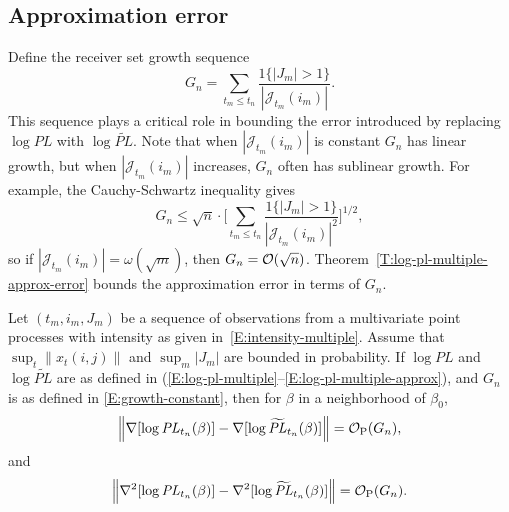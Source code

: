 \documentclass[final]{statsoc}
\begin{document}
\subsection{Approximation error}\label{S:approximation-error}
Define the receiver set growth sequence
\begin{equation}\label{E:growth-constant}
    G_n
        =
            \sum_{t_m \leq t_n}
                \frac{1\{|J_m| > 1\}}{|\mathcal{J}_{t_m}(i_m)|}.
\end{equation}
This sequence plays a critical role in bounding the error introduced by
replacing $\log \mathit{PL}$ with $\log \widetilde{\mathit{PL}}$.
Note that when $|\mathcal{J}_{t_m}(i_m)|$ is constant $G_n$ has linear
growth, but when $|\mathcal{J}_{t_m}(i_m)|$ increases, $G_n$ often has
sublinear growth.  For example, the Cauchy-Schwartz inequality gives
\[
    G_n
        \leq
            \sqrt{n}
            \cdot
            \bigg[
                \sum_{t_m \leq t_n}
                    \frac{1\{|J_m| > 1\}}{|\mathcal{J}_{t_m}(i_m)|^2}
            \bigg]^{1/2},
\]
so if $|\mathcal{J}_{t_m}(i_m)| = \omega(\sqrt{m})$, then
$G_n = \mathcal{O}(\sqrt{n})$.  Theorem~\ref{T:log-pl-multiple-approx-error} bounds
the approximation error in terms of $G_n$.

\begin{theorem}\label{T:log-pl-multiple-approx-error}
    Let $(t_m, i_m, J_m)$ be a sequence of observations from a multivariate
    point processes with intensity as given in~\eqref{E:intensity-multiple}.
    Assume that
    \(
        \sup_t \| x_t (i,j) \|
    \)
    and
    \(
        \sup_m | J_m |
    \)
    are bounded in probability.
    If $\log \mathit{PL}$ and $\log \widetilde{\mathit{PL}}$ are as
    defined in
    \textnormal{(}\ref{E:log-pl-multiple}--\ref{E:log-pl-multiple-approx}\textnormal{)},
    and $G_n$ is as defined in \eqref{E:growth-constant},
    then for $\beta$ in a neighborhood of $\beta_0$,
    \[
        \Big\|
        \nabla [\log \mathit{PL}_{t_n}(\beta) ]
        -
        \nabla [\log \widetilde{\mathit{PL}}_{t_n}(\beta) ]
        \Big\|
            =
            \mathcal{O}_\text{P}(G_n),
    \]
    and
    \[
        \Big\|
        \nabla^2 [\log \mathit{PL}_{t_n}(\beta) ]
        -
        \nabla^2 [\log \widetilde{\mathit{PL}}_{t_n}(\beta) ]
        \Big\|
            =
            \mathcal{O}_\text{P}(G_n).
    \]
\end{theorem}
\end{document}
